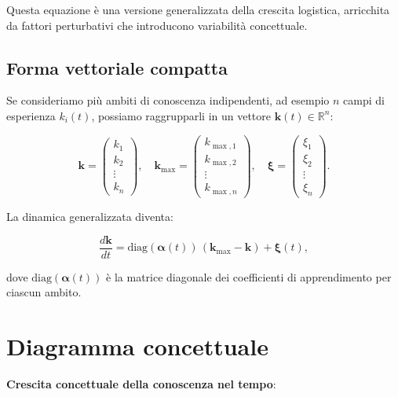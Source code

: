 \documentclass[12pt,a4paper]{article}
\begin{document}
Questa equazione è una versione generalizzata della crescita logistica, arricchita da fattori perturbativi che introducono variabilità concettuale.

\subsection{Forma vettoriale compatta}

Se consideriamo più ambiti di conoscenza indipendenti, ad esempio $n$ campi di esperienza $k_i(t)$, possiamo raggrupparli in un vettore \(\bm{k}(t) \in \mathbb{R}^n\):

\[
\bm{k} = 
\begin{pmatrix} k_1 \\ k_2 \\ \vdots \\ k_n \end{pmatrix}, \quad
\bm{k}_{\max} = 
\begin{pmatrix} k_{\max,1} \\ k_{\max,2} \\ \vdots \\ k_{\max,n} \end{pmatrix}, \quad
\bm{\xi} = 
\begin{pmatrix} \xi_1 \\ \xi_2 \\ \vdots \\ \xi_n \end{pmatrix}.
\]

La dinamica generalizzata diventa:

\begin{equation}
\frac{d \bm{k}}{dt} = \text{diag}(\bm{\alpha}(t)) \, (\bm{k}_{\max} - \bm{k}) + \bm{\xi}(t),
\end{equation}

dove $\text{diag}(\bm{\alpha}(t))$ è la matrice diagonale dei coefficienti di apprendimento per ciascun ambito.


\section{Diagramma concettuale}

\textbf{Crescita concettuale della conoscenza nel tempo}:
\end{document}
